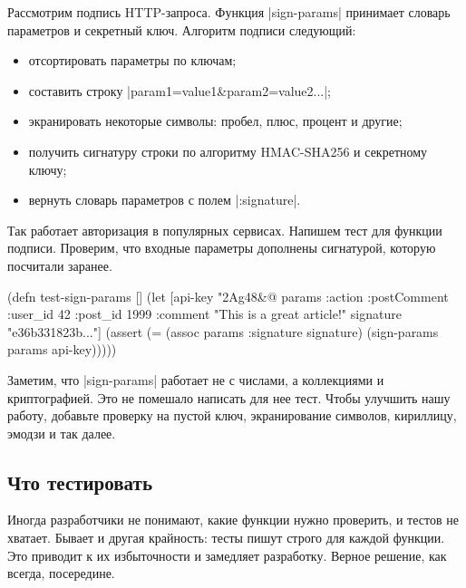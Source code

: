 Рассмотрим подпись HTTP-запроса. Функция \spverb|sign-params| принимает словарь
параметров и секретный ключ. Алгоритм подписи следующий:

\begin{itemize}

\item
  отсортировать параметры по ключам;

\item
  составить строку \spverb|param1=value1&param2=value2...|;

\item
  экранировать некоторые символы: пробел, плюс, процент и другие;

\item
  получить сигнатуру строки по алгоритму HMAC-SHA256 и секретному ключу;

\item
  вернуть словарь параметров с полем \spverb|:signature|.

\end{itemize}

Так работает авторизация в популярных сервисах. Напишем тест для функции
подписи. Проверим, что входные параметры дополнены сигнатурой, которую посчитали
заранее.

\begin{english}
  \begin{clojure}
(defn test-sign-params []
  (let [api-key "2Ag48&@%
        params {:action :postComment
                :user_id 42
                :post_id 1999
                :comment "This is a great article!"}
        signature "e36b331823b..."]
    (assert (= (assoc params :signature signature)
               (sign-params params api-key)))))
  \end{clojure}
\end{english}

Заметим, что \spverb|sign-params| работает не с числами, а коллекциями и
криптографией. Это не помешало написать для нее тест. Чтобы улучшить нашу
работу, добавьте проверку на пустой ключ, экранирование символов, кириллицу,
эмодзи и так далее.

\subsection{Что тестировать}

Иногда разработчики не понимают, какие функции нужно проверить, и тестов не
хватает. Бывает и другая крайность: тесты пишут строго для каждой функции. Это
приводит к их избыточности и замедляет разработку. Верное решение, как всегда,
посередине.

